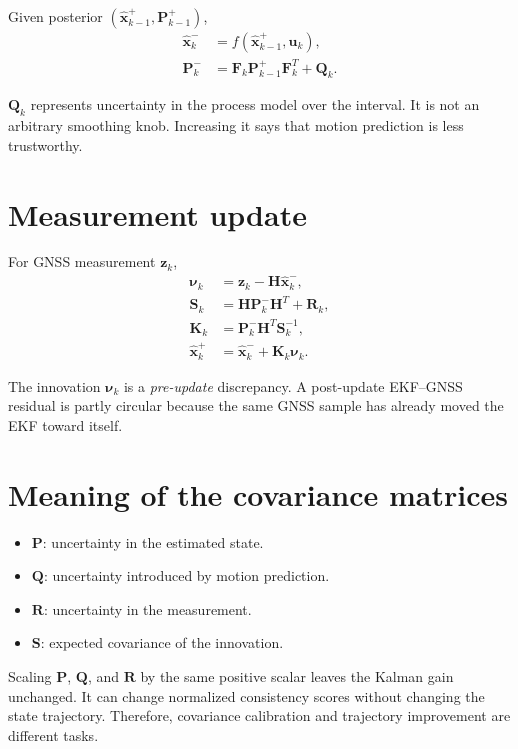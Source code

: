 \documentclass[11pt,oneside]{book}
\newcommand{\vect}[1]{\bm{#1}}
\begin{document}
Given posterior $(\hat{\vect{x}}_{k-1}^{+},\vect{P}_{k-1}^{+})$,
\begin{align}
\hat{\vect{x}}_k^{-} &= f(\hat{\vect{x}}_{k-1}^{+},\vect{u}_k),\\
\vect{P}_k^{-} &= \vect{F}_k\vect{P}_{k-1}^{+}\vect{F}_k^T+\vect{Q}_k.
\end{align}

$\vect{Q}_k$ represents uncertainty in the process model over the interval. It
is not an arbitrary smoothing knob. Increasing it says that motion prediction
is less trustworthy.

\section{Measurement update}

For GNSS measurement $\vect{z}_k$,
\begin{align}
\vect{\nu}_k &= \vect{z}_k-\vect{H}\hat{\vect{x}}_k^{-},\\
\vect{S}_k &= \vect{H}\vect{P}_k^{-}\vect{H}^T+\vect{R}_k,\\
\vect{K}_k &= \vect{P}_k^{-}\vect{H}^T\vect{S}_k^{-1},\\
\hat{\vect{x}}_k^{+} &= \hat{\vect{x}}_k^{-}+\vect{K}_k\vect{\nu}_k.
\end{align}

The innovation $\vect{\nu}_k$ is a \emph{pre-update} discrepancy. A
post-update EKF--GNSS residual is partly circular because the same GNSS sample
has already moved the EKF toward itself.

\section{Meaning of the covariance matrices}

\begin{itemize}
  \item $\vect{P}$: uncertainty in the estimated state.
  \item $\vect{Q}$: uncertainty introduced by motion prediction.
  \item $\vect{R}$: uncertainty in the measurement.
  \item $\vect{S}$: expected covariance of the innovation.
\end{itemize}

Scaling $\vect{P}$, $\vect{Q}$, and $\vect{R}$ by the same positive scalar
leaves the Kalman gain unchanged. It can change normalized consistency scores
without changing the state trajectory. Therefore, covariance calibration and
trajectory improvement are different tasks.
\end{document}
